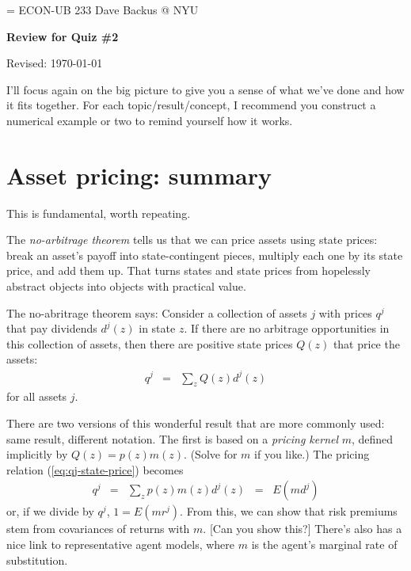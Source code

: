 \documentclass[11pt]{article}
\begin{document}
\parskip=\bigskipamount
\parindent=0.0in
\thispagestyle{empty}
{\large ECON-UB 233 \hfill Dave Backus @ NYU}

\bigskip\bigskip
\centerline{\Large \bf Review for Quiz \#2}
\centerline{Revised: \today}

\bigskip
I'll focus again on the big picture to give you a sense of
what we've done and how it fits together.
For each topic/result/concept, I recommend you construct a numerical example or two to
remind yourself how it works.


\section{Asset pricing:  summary}

This is fundamental, worth repeating.

The {\it no-arbitrage theorem\/} tells us that we can price
assets using state prices:
break an asset's payoff into state-contingent pieces,
multiply each one by its state price, and add them up.
That turns states and state prices from hopelessly abstract objects
into objects with practical value.

The no-abritrage theorem says:
Consider a collection of assets $j$ with prices $q^j$ that pay dividends $d^j(z)$
in state $z$.
If there are no arbitrage opportunities in this collection of assets,
then there are positive state prices $Q(z)$ that price the assets:
\begin{eqnarray}
    q^j &=& \sum_z Q(z) d^j(z)
    \label{eq:qj-state-price}
\end{eqnarray}
for all assets $j$.

There are two versions of this wonderful result that are more commonly used:
same result, different notation.  
The first is based on a {\it pricing kernel\/} $m$,
defined implicitly by $ Q(z) = p(z) m(z)$.
(Solve for $m$ if you like.)
The pricing relation (\ref{eq:qj-state-price}) becomes
\begin{eqnarray}
    q^j &=& \sum_z p(z) m(z) d^j(z) \;\;=\;\; E (m d^j) 
    \label{eq:q=Emd}
\end{eqnarray}
or, if we divide by $q^j$, $ 1 = E(mr^j) $.
From this, we can show that risk premiums stem from covariances of returns with $m$.
[Can you show this?]
There's also has a nice link to representative agent models,
where $m$ is the agent's marginal rate of substitution.
\end{document}
